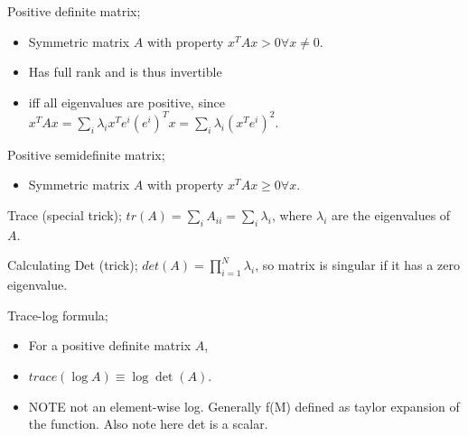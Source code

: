 \documentclass{article}
\begin{document}
Positive definite matrix; \begin{itemize}
	\item Symmetric matrix $A$ with property $x^TAx >  0 \forall x \ne 0$.
	\item Has full rank and is thus invertible
	\item iff all eigenvalues are positive, since $x^TAx = \sum_i \lambda_i x^Te^i(e^i)^Tx = \sum_i \lambda_i (x^Te^i)^2$.
\end{itemize}

Positive semidefinite matrix; \begin{itemize}
	\item Symmetric matrix $A$ with property $x^TAx \geq  0 \forall x$.
\end{itemize}

Trace (special trick); $tr(A) = \sum_i A_{ii} = \sum_i{\lambda_i}$, where $\lambda_i$ are the eigenvalues of $A$.

Calculating Det (trick); $det(A) = \prod_{i=1}^{N}\lambda_i$, so matrix is singular if it has a zero eigenvalue.

Trace-log formula; \begin{itemize}
	\item For a positive definite matrix $A$,
	\item $trace(\log A) \equiv \log \det (A)$.
	\item NOTE not an element-wise log. Generally f(M) defined as taylor expansion of the function. Also note here det is a scalar.
\end{itemize}
\end{document}
